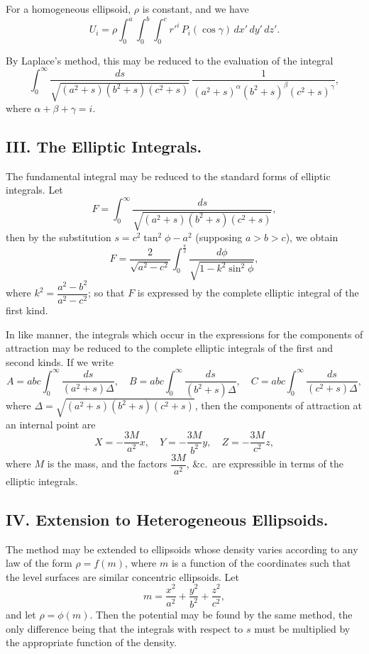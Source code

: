 \documentclass[11pt,a4paper]{article}
\theoremstyle{plain}
\begin{document}
For a homogeneous ellipsoid, $\rho$ is constant, and we have
\[
U_i = \rho \int_0^a \int_0^b \int_0^c r'^i\, P_i(\cos\gamma)\, dx'\,dy'\,dz'.
\]

By Laplace's method, this may be reduced to the evaluation of the integral
\[
\int_0^\infty \frac{ds}{\sqrt{(a^2+s)(b^2+s)(c^2+s)}}\, \frac{1}{(a^2+s)^{\alpha}(b^2+s)^{\beta}(c^2+s)^{\gamma}},
\]
where $\alpha+\beta+\gamma=i$.

\subsection*{III. The Elliptic Integrals.}

The fundamental integral may be reduced to the standard forms of elliptic integrals. Let
\[
F = \int_0^\infty \frac{ds}{\sqrt{(a^2+s)(b^2+s)(c^2+s)}},
\]
then by the substitution $s=c^2\tan^2\phi-a^2$ (supposing $a>b>c$), we obtain
\[
F = \frac{2}{\sqrt{a^2-c^2}} \int_0^{\frac{\pi}{2}} \frac{d\phi}{\sqrt{1-k^2\sin^2\phi}},
\]
where $k^2=\dfrac{a^2-b^2}{a^2-c^2}$; so that $F$ is expressed by the complete elliptic integral of the first kind.

In like manner, the integrals which occur in the expressions for the components of attraction may be reduced to the complete elliptic integrals of the first and second kinds. If we write
\[
A = abc \int_0^\infty \frac{ds}{(a^2+s)\Delta},\quad
B = abc \int_0^\infty \frac{ds}{(b^2+s)\Delta},\quad
C = abc \int_0^\infty \frac{ds}{(c^2+s)\Delta},
\]
where $\Delta=\sqrt{(a^2+s)(b^2+s)(c^2+s)}$, then the components of attraction at an internal point are
\[
X = -\frac{3M}{a^2}x,\quad Y = -\frac{3M}{b^2}y,\quad Z = -\frac{3M}{c^2}z,
\]
where $M$ is the mass, and the factors $\dfrac{3M}{a^2}$, \&c.\ are expressible in terms of the elliptic integrals.

\subsection*{IV. Extension to Heterogeneous Ellipsoids.}

The method may be extended to ellipsoids whose density varies according to any law of the form $\rho=f(m)$, where $m$ is a function of the coordinates such that the level surfaces are similar concentric ellipsoids. Let
\[
m = \frac{x^2}{a^2} + \frac{y^2}{b^2} + \frac{z^2}{c^2},
\]
and let $\rho=\phi(m)$. Then the potential may be found by the same method, the only difference being that the integrals with respect to $s$ must be multiplied by the appropriate function of the density.
\end{document}
